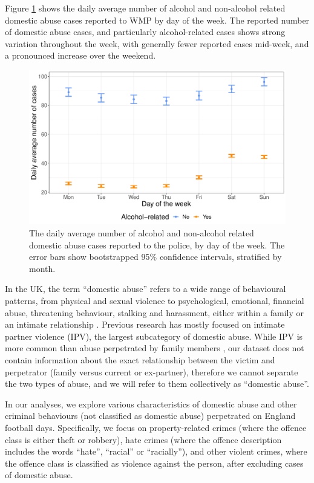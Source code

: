\documentclass[12pt, a4paper]{article}
\begin{document}
Figure \ref{fig:descriptive} shows the daily average number of alcohol and non-alcohol related domestic abuse cases reported to WMP by day of the week. The reported number of domestic abuse cases, and particularly alcohol-related cases shows strong variation throughout the week, with generally fewer reported cases mid-week, and a pronounced increase over the weekend. 

\begin{figure} 
\begin{center} 
\includegraphics[scale = 0.6]{descriptives.pdf}
\caption{The daily average number of alcohol and non-alcohol related domestic abuse cases reported to the police, by day of the week. The error bars show bootstrapped 95\% confidence intervals, stratified by month. \label{fig:descriptive}} 
\end{center} 
\end{figure} 

In the UK, the term ``domestic abuse'' refers to a wide range of behavioural patterns, from physical and sexual violence to psychological, emotional, financial abuse, threatening behaviour, stalking and harassment, either within a family or an intimate relationship \cite{ONS}. Previous research has mostly focused on intimate partner violence (IPV), the largest subcategory of domestic abuse. While IPV is more common than abuse perpetrated by family members \cite{ONS}, our dataset does not contain information about the exact relationship between the victim and perpetrator (family versus current or ex-partner), therefore we cannot separate the two types of abuse, and we will refer to them collectively as ``domestic abuse''.

In our analyses, we explore various characteristics of domestic abuse and other criminal behaviours (not classified as domestic abuse) perpetrated on England football days. Specifically, we focus on property-related crimes (where the offence class is either theft or robbery), hate crimes (where the offence description includes the words ``hate'', ``racial'' or ``racially''), and other violent crimes, where the offence class is classified as violence against the person, after excluding cases of domestic abuse. 
\end{document}
